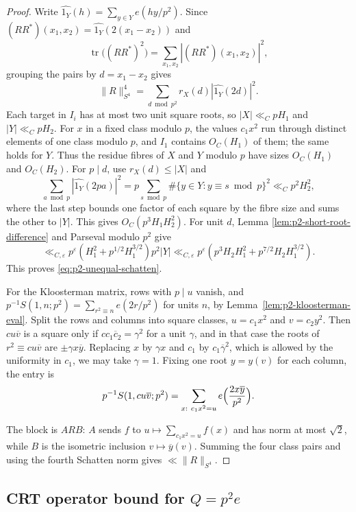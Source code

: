 \documentclass[12pt, a4paper]{amsart}
\numberwithin{equation}{section}
\newcommand{\e}{e}
\newcommand{\ep}{\varepsilon}
\renewcommand{\bar}[1]{\overline{#1}}
\renewcommand{\le}{\leqslant}
\theoremstyle{plain}
\begin{document}
\begin{proof}
Write $\widehat{1_Y}(h)=\sum_{y\in Y}\e(hy/p^2)$. Since $(RR^*)(x_1,x_2)=\widehat{1_Y}(2(x_1-x_2))$ and
$$
\operatorname{tr}\bigl((RR^*)^2\bigr)=\sum_{x_1,x_2}|(RR^*)(x_1,x_2)|^2,
$$
grouping the pairs by $d=x_1-x_2$ gives
\begin{equation}\label{eq:p2-schatten-identity}
\|R\|_{S^4}^4
=\sum_{d\bmod p^2}r_X(d)|\widehat{1_Y}(2d)|^2.
\end{equation}
 Each target in $I_i$ has at most two unit square roots, so $|X|\ll_CpH_1$ and $|Y|\ll_CpH_2$. For $x$ in a fixed class modulo $p$, the values $c_1x^2$ run through distinct elements of one class modulo $p$, and $I_1$ contains $O_C(H_1)$ of them; the same holds for $Y$. Thus the residue fibres of $X$ and $Y$ modulo $p$ have sizes $O_C(H_1)$ and $O_C(H_2)$. For $p\mid d$, use $r_X(d)\le |X|$ and
$$
\sum_{a\bmod p}|\widehat{1_Y}(2pa)|^2
=p\sum_{s\bmod p}\#\{y\in Y:y\equiv s\bmod p\}^2
\ll_Cp^2H_2^2,
$$
 where the last step bounds one factor of each square by the fibre size and sums the other to $|Y|$. This gives $O_C(p^3H_1H_2^2)$. For unit $d$, Lemma \ref{lem:p2-short-root-difference} and Parseval modulo $p^2$ give
$$
\ll_{C,\ep}p^\ep(H_1^2+p^{1/2}H_1^{3/2})p^2|Y|
\ll_{C,\ep}p^\ep(p^3H_2H_1^2+p^{7/2}H_2H_1^{3/2}).
$$
This proves \eqref{eq:p2-unequal-schatten}.

For the Kloosterman matrix, rows with $p\mid u$ vanish, and $p^{-1}S(1,n;p^2)=\sum_{r^2\equiv n}\e(2r/p^2)$ for units $n$, by Lemma~\ref{lem:p2-kloosterman-eval}. Split the rows and columns into square classes, $u=c_1x^2$ and $v=c_2y^2$. Then $cu\bar v$ is a square only if $cc_1\bar c_2=\gamma^2$ for a unit $\gamma$, and in that case the roots of $r^2\equiv cu\bar v$ are $\pm\gamma x\bar y$. Replacing $x$ by $\gamma x$ and $c_1$ by $c_1\bar\gamma^2$, which is allowed by the uniformity in $c_1$, we may take $\gamma=1$. Fixing one root $y=y(v)$ for each column, the entry is
$$
p^{-1}S(1,cu\bar v;p^2)=\sum_{x:\ c_1x^2=u}\e\Bigl(\frac{2x\bar y}{p^2}\Bigr).
$$

The block is $ARB$: $A$ sends $f$ to $u\mapsto\sum_{c_1x^2=u}f(x)$ and has norm at most $\sqrt2$, while $B$ is the isometric inclusion $v\mapsto\bar y(v)$. Summing the four class pairs and using the fourth Schatten norm gives $\ll\|R\|_{S^4}$.
\end{proof}

\subsection{CRT operator bound for $Q=p^2e$}
\end{document}
